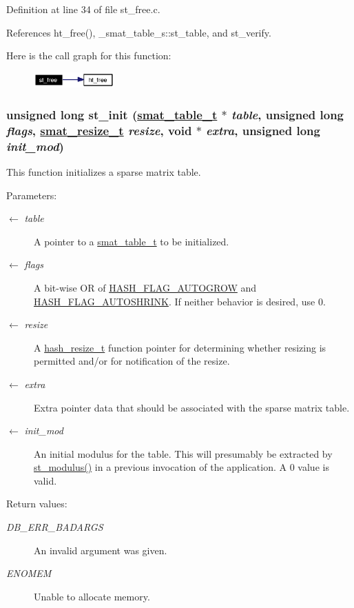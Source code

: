 Definition at line 34 of file st\_\-free.c.

References ht\_\-free(), \_\-smat\_\-table\_\-s::st\_\-table, and st\_\-verify.

Here is the call graph for this function:\begin{figure}[H]
\begin{center}
\leavevmode
\includegraphics[width=88pt]{group__dbprim__smat_ga19_cgraph}
\end{center}
\end{figure}
\hypertarget{group__dbprim__smat_ga12}{
\subsubsection[st\_\-init]{\setlength{\rightskip}{0pt plus 5cm}unsigned long st\_\-init (\hyperlink{struct__smat__table__s}{smat\_\-table\_\-t} $\ast$ {\em table}, unsigned long {\em flags}, \hyperlink{group__dbprim__smat_ga3}{smat\_\-resize\_\-t} {\em resize}, void $\ast$ {\em extra}, unsigned long {\em init\_\-mod})}}
\label{group__dbprim__smat_ga12}


This function initializes a sparse matrix table.

\begin{Desc}
\item[Parameters:]
\begin{description}
\item[\mbox{$\leftarrow$} {\em table}]A pointer to a \hyperlink{group__dbprim__smat_ga0}{smat\_\-table\_\-t} to be initialized. \item[\mbox{$\leftarrow$} {\em flags}]A bit-wise OR of \hyperlink{group__dbprim__hash_ga22}{HASH\_\-FLAG\_\-AUTOGROW} and \hyperlink{group__dbprim__hash_ga23}{HASH\_\-FLAG\_\-AUTOSHRINK}. If neither behavior is desired, use 0. \item[\mbox{$\leftarrow$} {\em resize}]A \hyperlink{group__dbprim__hash_ga6}{hash\_\-resize\_\-t} function pointer for determining whether resizing is permitted and/or for notification of the resize. \item[\mbox{$\leftarrow$} {\em extra}]Extra pointer data that should be associated with the sparse matrix table. \item[\mbox{$\leftarrow$} {\em init\_\-mod}]An initial modulus for the table. This will presumably be extracted by \hyperlink{group__dbprim__smat_ga37}{st\_\-modulus()} in a previous invocation of the application. A 0 value is valid.\end{description}
\end{Desc}
\begin{Desc}
\item[Return values:]
\begin{description}
\item[{\em DB\_\-ERR\_\-BADARGS}]An invalid argument was given. \item[{\em ENOMEM}]Unable to allocate memory.\end{description}
\end{Desc}


